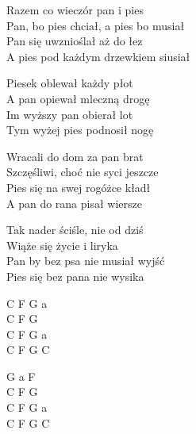 \begin{text}
    Razem co wieczór pan i pies\\
    Pan, bo pies chciał, a pies bo musiał\\
    Pan się uwznioślał aż do łez\\
    A pies pod każdym drzewkiem siusiał

    Piesek oblewał każdy płot\\
    A pan opiewał mleczną drogę\\
    Im wyższy pan obierał lot\\
    Tym wyżej pies podnosił nogę

    Wracali do dom za pan brat\\
    Szczęśliwi, choć nie syci jeszcze\\
    Pies się na swej rogóżce kładł\\
    A pan do rana pisał wiersze

    Tak nader ściśle, nie od dziś\\
    Wiąże się życie i liryka\\
    Pan by bez psa nie musiał wyjść\\
    Pies się bez pana nie wysika
\end{text}
\begin{chord}
    C F G a\\
    C F G\\
    C F G a\\
    C F G C

    G a F\\
    C F G\\
    C F G a\\
    C F G C
\end{chord}